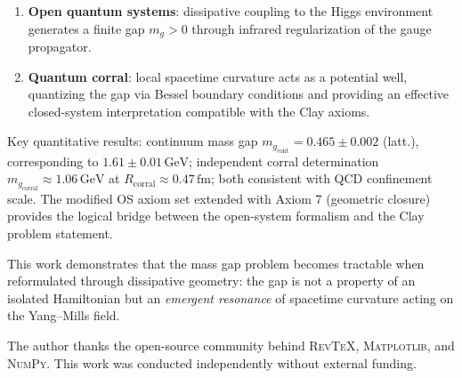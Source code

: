 \documentclass[aps,prd,reprint,superscriptaddress,floatfix]{revtex4-2}
\theoremstyle{definition}
\newcommand{\GeV}{\,\mathrm{GeV}}
\newcommand{\fm}{\,\mathrm{fm}}
\newcommand{\cont}{_{\mathrm{cont}}}
\newcommand{\corr}{_{\mathrm{corral}}}
\begin{document}
\begin{enumerate}
  \item \textbf{Open quantum systems}: dissipative coupling to the Higgs
        environment generates a finite gap $m_g>0$ through infrared
        regularization of the gauge propagator.
  \item \textbf{Quantum corral}: local spacetime curvature acts as a
        potential well, quantizing the gap via Bessel boundary conditions
        and providing an effective closed-system interpretation compatible
        with the Clay axioms.
\end{enumerate}

Key quantitative results: continuum mass gap $m_g\cont=0.465\pm 0.002$ (latt.),
corresponding to $1.61\pm 0.01\GeV$; independent corral determination
$m_g\corr\approx 1.06\GeV$ at $R\corr\approx 0.47\fm$; both consistent with
QCD confinement scale. The modified OS axiom set extended with Axiom 7
(geometric closure) provides the logical bridge between the open-system
formalism and the Clay problem statement.

This work demonstrates that the mass gap problem becomes tractable when
reformulated through dissipative geometry: the gap is not a property of an
isolated Hamiltonian but an \emph{emergent resonance} of spacetime curvature
acting on the Yang--Mills field.

\begin{acknowledgments}
The author thanks the open-source community behind \textsc{RevTeX},
\textsc{Matplotlib}, and \textsc{NumPy}. This work was conducted independently
without external funding.
\end{acknowledgments}
\end{document}
